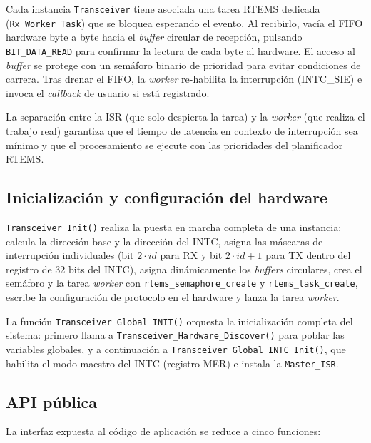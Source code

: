 Cada instancia \texttt{Transceiver} tiene asociada una tarea RTEMS dedicada
(\texttt{Rx\_Worker\_Task}) que se bloquea esperando el evento. Al recibirlo, vacía el FIFO
hardware byte a byte hacia el \textit{buffer} circular de recepción, pulsando \texttt{BIT\_DATA\_READ}
para confirmar la lectura de cada byte al hardware. El acceso al \textit{buffer} se protege con un
semáforo binario de prioridad para evitar condiciones de carrera. Tras drenar el FIFO, la
\textit{worker} re-habilita la interrupción (INTC\_SIE) e invoca el \textit{callback} de usuario si está
registrado.

La separación entre la ISR (que solo despierta la tarea) y la \textit{worker} (que realiza el trabajo
real) garantiza que el tiempo de latencia en contexto de interrupción sea mínimo y que el
procesamiento se ejecute con las prioridades del planificador RTEMS.

\subsection{Inicialización y configuración del hardware}

\texttt{Transceiver\_Init()} realiza la puesta en marcha completa de una instancia: calcula la
dirección base y la dirección del INTC, asigna las máscaras de interrupción individuales (bit
$2 \cdot id$ para RX y bit $2 \cdot id + 1$ para TX dentro del registro de 32 bits del INTC),
asigna dinámicamente los \textit{buffers} circulares, crea el semáforo y la tarea \textit{worker} con
\texttt{rtems\_semaphore\_create} y \texttt{rtems\_task\_create}, escribe la configuración de
protocolo en el hardware y lanza la tarea \textit{worker}.

La función \texttt{Transceiver\_Global\_INIT()} orquesta la inicialización completa del sistema:
primero llama a \texttt{Transceiver\_Hardware\_Discover()} para poblar las variables globales, y a
continuación a \texttt{Transceiver\_Global\_INTC\_Init()}, que habilita el modo maestro del INTC
(registro MER) e instala la \texttt{Master\_ISR}.

\subsection{API pública}

La interfaz expuesta al código de aplicación se reduce a cinco funciones:

